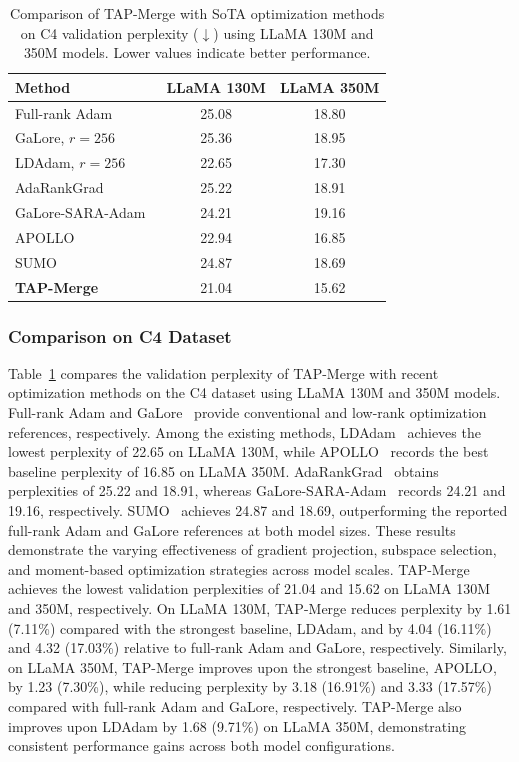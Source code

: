\documentclass[fleqn,10pt]{wlscirep}
\begin{document}
\begin{table}[t]
\centering\small
\caption{Comparison of TAP-Merge with SoTA optimization methods on C4 validation perplexity ($\downarrow$) using LLaMA 130M and 350M models. Lower values indicate better performance.}
\label{tab:c4_complete}
\begin{tabular}{lcc}
\toprule
Method & LLaMA 130M & LLaMA 350M\\
\midrule
Full-rank Adam~\cite{galore2024} & 25.08 & 18.80\\
GaLore, $r=256$~\cite{galore2024} & 25.36 & 18.95\\
LDAdam, $r=256$~\cite{ldadam2025} & 22.65 & 17.30\\
AdaRankGrad~\cite{adarankgrad2025} & 25.22 & 18.91\\
GaLore-SARA-Adam~\cite{sara2025} & 24.21 & 19.16\\
APOLLO~\cite{apollo2025} & 22.94 & 16.85\\
SUMO~\cite{sumo2025} & 24.87 & 18.69\\
\midrule
\textbf{TAP-Merge} & 21.04 & 15.62\\ \bottomrule
\end{tabular}
\end{table}


\subsubsection{Comparison on C4 Dataset}
\label{subsec:performance_c4}
Table~\ref{tab:c4_complete} compares the validation perplexity of TAP-Merge with recent optimization methods on the C4 dataset using LLaMA 130M and 350M models. Full-rank Adam and GaLore~\cite{galore2024} provide conventional and low-rank optimization references, respectively. Among the existing methods, LDAdam~\cite{ldadam2025} achieves the lowest perplexity of 22.65 on LLaMA 130M, while APOLLO~\cite{apollo2025} records the best baseline perplexity of 16.85 on LLaMA 350M. AdaRankGrad~ \cite{adarankgrad2025} obtains perplexities of 25.22 and 18.91, whereas GaLore-SARA-Adam~\cite{sara2025} records 24.21 and 19.16, respectively. SUMO~\cite{sumo2025} achieves 24.87 and 18.69, outperforming the reported full-rank Adam and GaLore references at both model sizes. These results demonstrate the varying effectiveness of gradient projection, subspace selection, and moment-based optimization strategies across model scales. TAP-Merge achieves the lowest validation perplexities of 21.04 and 15.62 on LLaMA 130M and 350M, respectively. On LLaMA 130M, TAP-Merge reduces perplexity by 1.61 (7.11\%) compared with the strongest baseline, LDAdam, and by 4.04 (16.11\%) and 4.32 (17.03\%) relative to full-rank Adam and GaLore, respectively. Similarly, on LLaMA 350M, TAP-Merge improves upon the strongest baseline, APOLLO, by 1.23 (7.30\%), while reducing perplexity by 3.18 (16.91\%) and 3.33 (17.57\%) compared with full-rank Adam and GaLore, respectively. TAP-Merge also improves upon LDAdam by 1.68 (9.71\%) on LLaMA 350M, demonstrating consistent performance gains across both model configurations.
\end{document}
